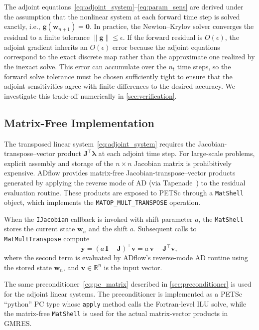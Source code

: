 \documentclass[journal]{new-aiaa}
\newcommand{\mb}[1]{\mathbf{#1}}
\newcommand{\mbg}[1]{\bm{#1}}
\begin{document}
The adjoint equations~\eqref{eq:adjoint_system}--\eqref{eq:param_sens} are derived under the assumption that the nonlinear system at each forward time step is solved exactly, i.e., $\mb{g}(\mb{w}_{n+1}) = \mb{0}$.
In practice, the Newton--Krylov solver converges the residual to a finite tolerance $\|\mb{g}\| \leq \epsilon$.
If the forward residual is $O(\epsilon)$, the adjoint gradient inherits an $O(\epsilon)$ error because the adjoint equations correspond to the exact discrete map rather than the approximate one realized by the inexact solve.
This error can accumulate over the $n_t$ time steps, so the forward solve tolerance must be chosen sufficiently tight to ensure that the adjoint sensitivities agree with finite differences to the desired accuracy.
We investigate this trade-off numerically in \cref{sec:verification}.

\subsection{Matrix-Free Implementation}\label{sec:matfree}
The transposed linear system~\eqref{eq:adjoint_system} requires the Jacobian-transpose--vector product $\mb{J}^\intercal \mbg{\lambda}$ at each adjoint time step.
For large-scale problems, explicit assembly and storage of the $n \times n$ Jacobian matrix is prohibitively expensive.
ADflow provides matrix-free Jacobian-transpose--vector products generated by applying the reverse mode of AD (via Tapenade~\cite{Hascoet2013}) to the residual evaluation routine.
These products are exposed to PETSc through a \texttt{MatShell} object, which implements the \texttt{MATOP\_MULT\_TRANSPOSE} operation.

When the \texttt{IJacobian} callback is invoked with shift parameter $a$, the \texttt{MatShell} stores the current state $\mb{w}_n$ and the shift $a$.
Subsequent calls to \texttt{MatMultTranspose} compute
\begin{equation}\label{eq:matshell}
\mb{y} = \left(a \, \mb{I} - \mb{J}\right)^\intercal \mb{v} = a \, \mb{v} - \mb{J}^\intercal \mb{v},
\end{equation}
where the second term is evaluated by ADflow's reverse-mode AD routine using the stored state $\mb{w}_n$, and $\mb{v} \in \mathbb{R}^n$ is the input vector.

The same preconditioner~\eqref{eq:pc_matrix} described in \cref{sec:preconditioner} is used for the adjoint linear systems.
The preconditioner is implemented as a PETSc ``python'' PC type whose \texttt{apply} method calls the Fortran-level ILU solve, while the matrix-free \texttt{MatShell} is used for the actual matrix-vector products in GMRES.
\end{document}
